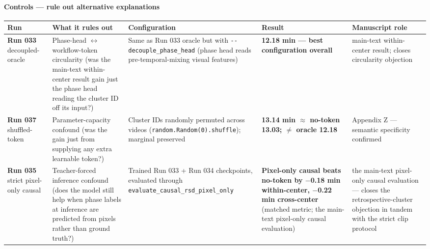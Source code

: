 \paragraph{Controls --- rule out alternative
explanations}\label{controls-rule-out-alternative-explanations}

\begin{longtable}[]{@{}
  >{\raggedright\arraybackslash}p{}
  >{\raggedright\arraybackslash}p{}
  >{\raggedright\arraybackslash}p{}
  >{\raggedright\arraybackslash}p{}
  >{\raggedright\arraybackslash}p{}@{}}
\toprule\noalign{}
\begin{minipage}[b]{\linewidth}\raggedright
Run
\end{minipage} & \begin{minipage}[b]{\linewidth}\raggedright
What it rules out
\end{minipage} & \begin{minipage}[b]{\linewidth}\raggedright
Configuration
\end{minipage} & \begin{minipage}[b]{\linewidth}\raggedright
Result
\end{minipage} & \begin{minipage}[b]{\linewidth}\raggedright
Manuscript role
\end{minipage} \\
\midrule\noalign{}
\endhead
\bottomrule\noalign{}
\endlastfoot
\textbf{Run 033} decoupled-oracle & Phase-head $\leftrightarrow$ workflow-token
circularity (was the main-text within-center result gain just the phase head reading the cluster
ID off its input?) & Same as Run 033 oracle but with
\texttt{-\/-decouple\_phase\_head} (phase head reads pre-temporal-mixing
visual features) & \textbf{12.18 min --- best configuration overall} &
main-text within-center result; closes circularity objection \\
\textbf{Run 037} shuffled-token & Parameter-capacity confound (was the
gain just from supplying any extra learnable token?) & Cluster IDs
randomly permuted across videos (\texttt{random.Random(0).shuffle});
marginal preserved & \textbf{13.14 min $\approx$ no-token 13.03; $\neq$ oracle 12.18}
& Appendix Z --- semantic specificity confirmed \\
\textbf{Run 035} strict pixel-only causal & Teacher-forced inference
confound (does the model still help when phase labels at inference are
predicted from pixels rather than ground truth?) & Trained Run 033 + Run
034 checkpoints, evaluated through
\texttt{evaluate\_causal\_rsd\_pixel\_only} & \textbf{Pixel-only causal
beats no-token by $-$0.18 min within-center, $-$0.22 min cross-center}
(matched metric; the main-text pixel-only causal evaluation) & the main-text pixel-only causal evaluation --- closes the retrospective-cluster
objection in tandem with the strict clip protocol \\
\end{longtable}

